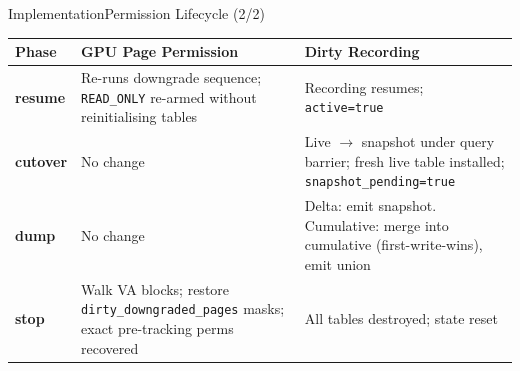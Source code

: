 \begin{frame}[c]{Implementation}{Permission Lifecycle (2/2)}
\begin{center}
\renewcommand{\arraystretch}{1.3}
\footnotesize
\begin{tabular}{p{22mm} p{58mm} p{52mm}}
\toprule
\textbf{Phase} & \textbf{GPU Page Permission} & \textbf{Dirty Recording} \\
\midrule
\textbf{resume} &
    Re-runs downgrade sequence; \texttt{READ\_ONLY} re-armed without reinitialising tables &
    Recording resumes; \texttt{active=true} \\
\textbf{cutover} &
    No change &
    Live $\to$ snapshot under query barrier; fresh live table installed; \texttt{snapshot\_pending=true} \\
\textbf{dump} &
    No change &
    Delta: emit snapshot. Cumulative: merge into cumulative (first-write-wins), emit union \\
\textbf{stop} &
    Walk VA blocks; restore \texttt{dirty\_downgraded\_pages} masks; exact pre-tracking perms recovered &
    All tables destroyed; state reset \\
\bottomrule
\end{tabular}
\end{center}
\end{frame}

